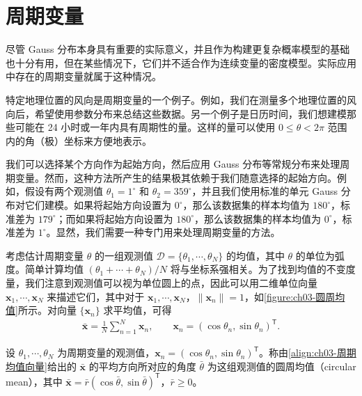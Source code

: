 \documentclass[../../main.tex]{subfiles}
\begin{document}
\section{周期变量}\label{section:ch03-周期变量}

尽管 Gauss 分布本身具有重要的实际意义，并且作为构建更复杂概率模型的基础也十分有用，但在某些情况下，它们并不适合作为连续变量的密度模型。实际应用中存在的周期变量就属于这种情况。

特定地理位置的风向是周期变量的一个例子。例如，我们在测量多个地理位置的风向后，希望使用参数分布来总结这些数据。另一个例子是日历时间，我们想建模那些可能在 24 小时或一年内具有周期性的量。这样的量可以使用 $0\leqslant\theta<2\pi$ 范围内的角（极）坐标来方便地表示。

我们可以选择某个方向作为起始方向，然后应用 Gauss 分布等常规分布来处理周期变量。然而，这种方法所产生的结果极其依赖于我们随意选择的起始方向。例如，假设有两个观测值 $\theta_1=1^{\circ}$ 和 $\theta_2=359^{\circ}$，并且我们使用标准的单元 Gauss 分布对它们建模。如果将起始方向设置为 $0^{\circ}$，那么该数据集的样本均值为 $180^{\circ}$，标准差为 $179^{\circ}$；而如果将起始方向设置为 $180^{\circ}$，那么该数据集的样本均值为 $0^{\circ}$，标准差为 $1^{\circ}$。显然，我们需要一种专门用来处理周期变量的方法。

考虑估计周期变量 $\theta$ 的一组观测值 $\mathcal{D}=\{\theta_1,\cdots,\theta_N\}$ 的均值，其中 $\theta$ 的单位为弧度。简单计算均值 $(\theta_1+\cdots+\theta_N)/N$ 将与坐标系强相关。为了找到均值的不变度量，我们注意到观测值可以视为单位圆上的点，因此可以用二维单位向量 $\boldsymbol{x}_1,\cdots,\boldsymbol{x}_N$ 来描述它们，其中对于 $\boldsymbol{x}_1,\cdots,\boldsymbol{x}_N$，$\lVert\boldsymbol{x}_n\rVert=1$，如\cref{figure:ch03-圆周均值}所示。对向量 $\{\boldsymbol{x}_n\}$ 求平均值，可得
\begin{align}
\bar{\boldsymbol{x}}=\frac{1}{N}\sum_{n=1}^{N}\boldsymbol{x}_n,\qquad \boldsymbol{x}_n=(\cos\theta_n,\sin\theta_n)^{\mathsf{T}}.
\label{align:ch03-周期均值向量}
\end{align}

\begin{definition}[圆周均值]\label{definition:ch03-圆周均值}
设 $\theta_1,\cdots,\theta_N$ 为周期变量的观测值，$\boldsymbol{x}_n=(\cos\theta_n,\sin\theta_n)^{\mathsf{T}}$。称由\eqref{align:ch03-周期均值向量}给出的 $\bar{\boldsymbol{x}}$ 的平均方向所对应的角度 $\bar{\theta}$ 为这组观测值的圆周均值（circular mean），其中 $\bar{\boldsymbol{x}}=\bar{r}(\cos\bar{\theta},\sin\bar{\theta})^{\mathsf{T}}$，$\bar{r}\geqslant0$。
\end{definition}
\end{document}
